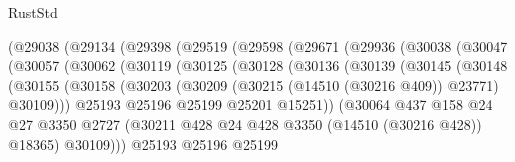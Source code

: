 \begin{lexlean}{RustStd}
\begin{coremodule}
                  (@29038
                    (@29134
                      (@29398
                        (@29519
                          (@29598
                            (@29671
                              (@29936
                                (@30038
                                  (@30047
                                    (@30057
                                      (@30062
                                        (@30119
                                          (@30125
                                            (@30128
                                              (@30136
                                                (@30139
                                                  (@30145
                                                    (@30148
                                                      (@30155
                                                        (@30158
                                                          (@30203
                                                            (@30209
                                                              (@30215 (@14510 (@30216 @409)) @23771)
                                                              @30109)))
                                                        @25193
                                                        @25196
                                                        @25199
                                                        @25201
                                                        @15251))
                                                    (@30064
                                                      @437
                                                      @158
                                                      @24
                                                      @27
                                                      @3350
                                                      @2727
                                                      (@30211
                                                        @428
                                                        @24
                                                        @428
                                                        @3350
                                                        (@14510 (@30216 @428))
                                                        @18365)
                                                      @30109)))
                                                @25193
                                                @25196
                                                @25199

\end{coremodule}
\end{lexlean}
